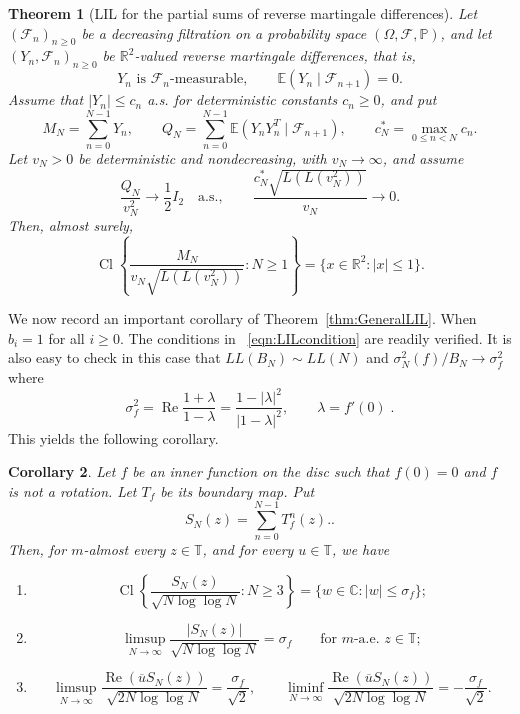 \documentclass[12pt, reqno, final, a4paper]{amsart}
\theoremstyle{plain}
\newtheorem{theorem}{Theorem}[section]
\newtheorem{corollary}[theorem]{Corollary}
\theoremstyle{definition}
\theoremstyle{remark}
\DeclareMathOperator{\Ree}{Re}
\DeclareMathOperator{\Cl}{Cl}
\newcommand{\T}{\mathbb T}
\newcommand{\C}{\mathbb C}
\newcommand{\E}{\mathbb E}
\newcommand{\1}{\mathbf 1}
\begin{document}
\begin{theorem}[LIL for the partial sums of reverse martingale differences]
\label{thm:LILforReverseMartingale}
Let $(\mathcal F_n)_{n\ge0}$ be a decreasing filtration on a probability space
$(\Omega,\mathcal F,\mathbb P)$, and let $(Y_n,\mathcal F_n)_{n\ge0}$ be
$\mathbb R^2$-valued reverse martingale differences, that is,
\[
        Y_n\text{ is }\mathcal F_n\text{-measurable},\qquad
        \E(Y_n\mid\mathcal F_{n+1})=0 .
\]
Assume that $|Y_n|\le c_n$ a.s. for deterministic constants $c_n\ge0$, and put
\[
        M_N=\sum_{n=0}^{N-1}Y_n,
        \qquad
        Q_N=\sum_{n=0}^{N-1}\E(Y_nY_n^T\mid\mathcal F_{n+1}),
        \qquad
        c_N^*=\max_{0\le n<N}c_n .
\]
Let $v_N>0$ be deterministic and nondecreasing, with $v_N\to\infty$, and assume
\begin{equation}\label{eq:revLIL-cov-matrix}
        \frac{Q_N}{v_N^2}\longrightarrow \frac12 I_2\quad\text{a.s.},
        \qquad
        \frac{c_N^*\sqrt{L(L(v_N^2))}}{v_N}\longrightarrow0 .
\end{equation}
Then, almost surely,
\[
        \Cl\left\{
        \frac{M_N}{v_N\sqrt{L(L(v_N^2))}}:N\ge1
        \right\}=\bigl\{x\in\mathbb R^2: |x|\le1\bigr\}.
\]
\end{theorem}


We now record an important corollary of Theorem~\ref{thm:GeneralLIL}. When $b_i=1$ for all $i\geq 0$. The conditions in ~\eqref{eqn:LILcondition} are readily verified. It is also easy to check in this case that $LL(B_N)\sim LL(N)$ and $\sigma_N^2(f)/B_N\to \sigma_f^2$ where
\[
  \sigma_f^2=\Ree\frac{1+\lambda}{1-\lambda}
    =\frac{1-|\lambda|^2}{|1-\lambda|^2}, \qquad \lambda = f'(0)\;.
\]
This yields the following corollary.

\begin{corollary}
\label{cor:main}
Let $f$ be an inner function on the disc such that $f(0)=0$ and $f$ is not a rotation. Let $T_f$ be its
boundary map. Put
\[
    S_N(z)=\sum_{n=0}^{N-1}T_f^n(z).
    .
\]
Then, for $m$-almost every $z\in\T$,  and for every $u\in\T$, we have

\begin{enumerate}
    \item[(a)] \[
        \Cl\left\{
        \frac{S_N(z)}{\sqrt{N\log\log N}}:N\ge 3
        \right\}
        =\{w\in\C: |w|\le \sigma_f\};
\]
\item[(b)] \[
         \limsup_{N\to\infty}
         \frac{|S_N(z)|}{\sqrt{N\log\log N}}
         =\sigma_f
         \qquad\text{for }m\text{-a.e. }z\in\T;
 \]
 \item[(c)]
\[
        \limsup_{N\to\infty}
        \frac{\Ree(\overline u S_N(z))}{\sqrt{2N\log\log N}}
        =\frac{\sigma_f}{\sqrt 2},
        \qquad
        \liminf_{N\to\infty}
        \frac{\Ree(\overline u S_N(z))}{\sqrt{2N\log\log N}}
        =-\frac{\sigma_f}{\sqrt 2}.
\]

\end{enumerate}
\end{corollary}
\end{document}

